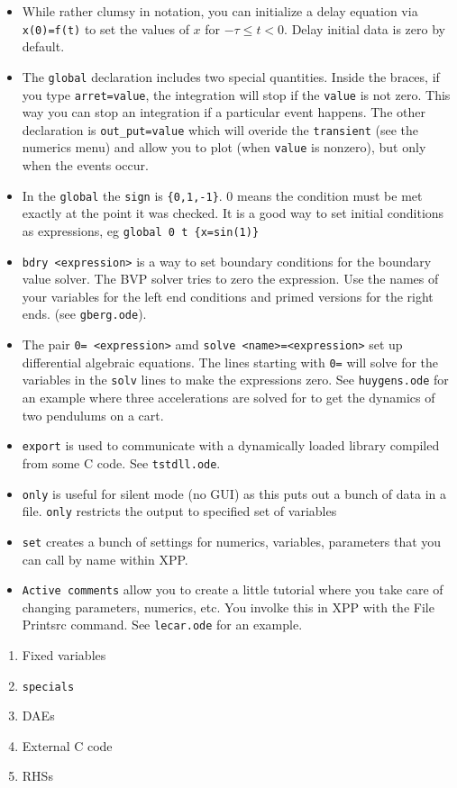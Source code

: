 \begin{itemize}
\item While rather clumsy in notation, you can initialize a delay equation via {\tt x(0)=f(t)} to set the values of $x$ for $-\tau\le t<0.$ Delay initial data is zero by default.  
\item The {\tt global} declaration includes two special quantities. Inside the braces, if you type {\tt arret=value}, the integration will stop if the {\tt value} is not zero. This way you can stop an integration if a particular event happens. The other declaration is {\tt out\_put=value} which will overide the {\tt transient} (see the numerics menu)  and allow you to plot (when {\tt value} is nonzero), but only when the events occur.  
\item In the {\tt global} the {\tt sign} is {\tt \{0,1,-1\}}. 0 means the condition must be met exactly at the point it was checked. It is a good way to set initial conditions as expressions, eg {\tt global 0 t \{x=sin(1)\} }
\item {\tt bdry <expression>} is a way to set boundary conditions for the boundary value solver. The BVP solver tries to zero the expression. Use the names of your variables for the left end conditions and primed versions for the right ends. (see {\tt gberg.ode}). 
\item The pair {\tt 0= <expression>} amd {\tt solve <name>=<expression>} set up differential algebraic equations. The lines starting with {\tt 0=} will solve for the variables in the {\tt solv} lines to make the expressions zero. See {\tt huygens.ode} for an example where three accelerations are solved for to get the dynamics of two pendulums on a cart.
\item {\tt export} is used to communicate with a dynamically loaded library compiled from some C code.  See {\tt tstdll.ode}.
\item {\tt only} is useful for silent mode (no GUI) as this puts out a bunch of data in a file. {\tt only} restricts the output to specified set of variables
\item {\tt set} creates a bunch of settings for numerics, variables, parameters that you can call by name within XPP.
\item {\tt Active comments} allow you to create a little tutorial where you take care of changing parameters, numerics, etc. You involke this in XPP with the File Printsrc command. See {\tt lecar.ode} for an example.

\end{itemize}

\medskip {}
\begin{enumerate}
\item Fixed variables
\item {\tt specials}
\item DAEs
\item External C code 
\item RHSs
\end{enumerate}

